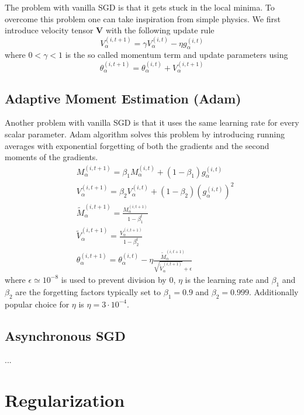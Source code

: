 \documentclass{myclass}
\begin{document}
The problem with vanilla SGD is that it gets stuck in the local minima. To overcome this problem one
can take inspiration from simple physics. We first introduce velocity tensor \(\bm{V}\) with the
following update rule
\[\boxed{ V^{(i,t+1)}_\alpha = \gamma V^{(i,t)}_\alpha - \eta g^{(i,t)}_\alpha }\] where \(0 <
   \gamma < 1\) is the so called momentum term and update parameters using
\[\boxed{ \theta_\alpha ^{(i,t+1)} = \theta_\alpha ^{(i,t)} + V_\alpha ^{(i,t+1)} }\]


\subsection{Adaptive Moment Estimation (Adam)}

Another problem with vanilla SGD is that it uses the same learning rate for every scalar parameter.
Adam algorithm solves this problem by introducing running averages with exponential forgetting of
both the gradients and the second moments of the gradients.
\[
\boxed{
\begin{split} 
   &M_\alpha^{(i,t+1)} = \beta_1 M_\alpha^{(i,t)} + (1-\beta_1) g_\alpha^{(i,t)} \\
   &V_\alpha ^{(i,t+1)} = \beta_2 V_\alpha^{(i,t)} + (1 - \beta_2) \left(g_\alpha^{(i,t)}\right)^2\\
   &\tilde{M}_\alpha^{(i,t+1)} = \frac{M_\alpha^{(i,t+1)}}{1 - \beta_1^t} \\
   &\tilde{V}_\alpha^{(i,t+1)}=\frac{ V_\alpha^{(i,t+1)}}{1 - \beta_2^t} \\
   &\theta_\alpha ^{(i,t+1)} = \theta_\alpha ^{(i,t)} - \eta \frac{\tilde{M}_\alpha^{(i,t+1)}}{\sqrt{\tilde{V}_\alpha^{(i,t+1)}} + \epsilon}
\end{split}
}
\] 
where \(\epsilon \simeq 10^{-8}\)  is used to prevent division by 0, \(\eta\) is the learning rate
and \(\beta_1\) and \(\beta_2\) are the forgetting factors typically set to \(\beta_1=0.9\) and
\(\beta_2=0.999\). Additionally popular choice for \(\eta\) is \(\eta = 3\cdot10^{-4}\).


\subsection{Asynchronous SGD}

...


\section{Regularization}
\end{document}
